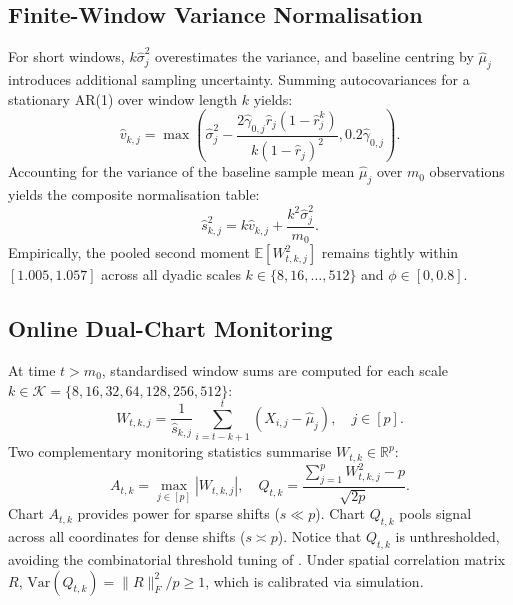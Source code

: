 \documentclass[lettersize,journal]{IEEEtran}
\begin{document}
\subsection{Finite-Window Variance Normalisation}
For short windows, $k \hat{\sigma}_j^2$ overestimates the variance, and baseline centring by $\hat{\mu}_j$ introduces additional sampling uncertainty. Summing autocovariances for a stationary AR(1) over window length $k$ yields:
\begin{equation}
    \hat{v}_{k,j} = \max\left( \hat{\sigma}_j^2 - \frac{2 \hat{\gamma}_{0,j} \hat{r}_j (1 - \hat{r}_j^k)}{k(1 - \hat{r}_j)^2}, 0.2 \hat{\gamma}_{0,j} \right). \label{eq:vkj}
\end{equation}
Accounting for the variance of the baseline sample mean $\hat{\mu}_j$ over $m_0$ observations yields the composite normalisation table:
\begin{equation}
    \hat{s}^2_{k,j} = k \hat{v}_{k,j} + \frac{k^2 \hat{\sigma}_j^2}{m_0}. \label{eq:skj}
\end{equation}
Empirically, the pooled second moment $\mathbb{E}[W_{t,k,j}^2]$ remains tightly within $[1.005, 1.057]$ across all dyadic scales $k \in \{8, 16, \ldots, 512\}$ and $\phi \in [0, 0.8]$.

\subsection{Online Dual-Chart Monitoring}
At time $t > m_0$, standardised window sums are computed for each scale $k \in \mathcal{K} = \{8, 16, 32, 64, 128, 256, 512\}$:
\begin{equation}
    W_{t,k,j} = \frac{1}{\hat{s}_{k,j}} \sum_{i=t-k+1}^t (X_{i,j} - \hat{\mu}_j), \quad j \in [p]. \label{eq:W}
\end{equation}
Two complementary monitoring statistics summarise $W_{t,k} \in \mathbb{R}^p$:
\begin{equation}
    A_{t,k} = \max_{j \in [p]} |W_{t,k,j}|, \quad Q_{t,k} = \frac{\sum_{j=1}^p W_{t,k,j}^2 - p}{\sqrt{2p}}. \label{eq:charts}
\end{equation}
Chart $A_{t,k}$ provides power for sparse shifts ($s \ll p$). Chart $Q_{t,k}$ pools signal across all coordinates for dense shifts ($s \asymp p$). Notice that $Q_{t,k}$ is unthresholded, avoiding the combinatorial threshold tuning of \cite{chen2020high}. Under spatial correlation matrix $R$, $\text{Var}(Q_{t,k}) = \|R\|_F^2 / p \ge 1$, which is calibrated via simulation.
\end{document}
